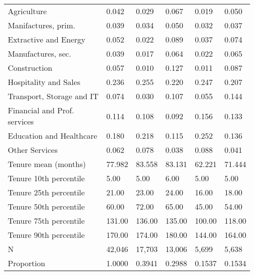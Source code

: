 \begin{tabular}{llllll}
Agriculture                  &   0.042 &   0.029 &   0.067 &              0.019 &            0.050 \\
Manifactures, prim.          &   0.039 &   0.034 &   0.050 &              0.032 &            0.037 \\
Extractive and Energy        &   0.052 &   0.022 &   0.089 &              0.037 &            0.074 \\
Manufactures, sec.           &   0.039 &   0.017 &   0.064 &              0.022 &            0.065 \\
Construction                 &   0.057 &   0.010 &   0.127 &              0.011 &            0.087 \\
Hospitality and Sales        &   0.236 &   0.255 &   0.220 &              0.247 &            0.207 \\
Transport, Storage and IT    &   0.074 &   0.030 &   0.107 &              0.055 &            0.144 \\
Financial and Prof. services &   0.114 &   0.108 &   0.092 &              0.156 &            0.133 \\
Education and Healthcare     &   0.180 &   0.218 &   0.115 &              0.252 &            0.136 \\
Other Services               &   0.062 &   0.078 &   0.038 &              0.088 &            0.041 \\
Tenure mean (months)         &  77.982 &  83.558 &  83.131 &             62.221 &           71.444 \\
Tenure 10th percentile       &    5.00 &    5.00 &    6.00 &               5.00 &             5.00 \\
Tenure 25th percentile       &   21.00 &   23.00 &   24.00 &              16.00 &            18.00 \\
Tenure 50th percentile       &   60.00 &   72.00 &   65.00 &              45.00 &            54.00 \\
Tenure 75th percentile       &  131.00 &  136.00 &  135.00 &             100.00 &           118.00 \\
Tenure 90th percentile       &  170.00 &  174.00 &  180.00 &             144.00 &           164.00 \\
N                            &  42,046 &  17,703 &  13,006 &              5,699 &            5,638 \\
Proportion                   &  1.0000 &  0.3941 &  0.2988 &             0.1537 &           0.1534 \\
\bottomrule
\end{tabular}
